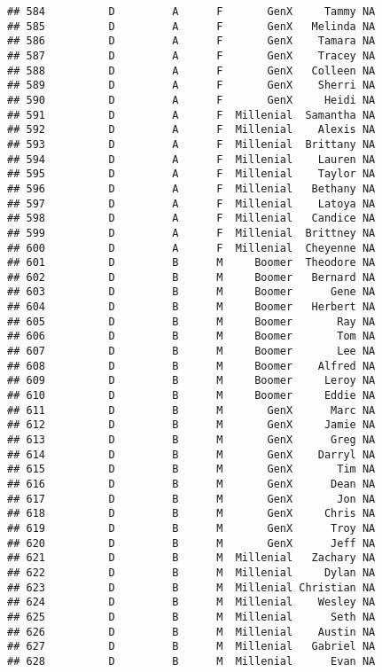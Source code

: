 \documentclass[
]{article}
\begin{document}
\begin{verbatim}
## 584          D         A      F       GenX     Tammy NA
## 585          D         A      F       GenX   Melinda NA
## 586          D         A      F       GenX    Tamara NA
## 587          D         A      F       GenX    Tracey NA
## 588          D         A      F       GenX   Colleen NA
## 589          D         A      F       GenX    Sherri NA
## 590          D         A      F       GenX     Heidi NA
## 591          D         A      F  Millenial  Samantha NA
## 592          D         A      F  Millenial    Alexis NA
## 593          D         A      F  Millenial  Brittany NA
## 594          D         A      F  Millenial    Lauren NA
## 595          D         A      F  Millenial    Taylor NA
## 596          D         A      F  Millenial   Bethany NA
## 597          D         A      F  Millenial    Latoya NA
## 598          D         A      F  Millenial   Candice NA
## 599          D         A      F  Millenial  Brittney NA
## 600          D         A      F  Millenial  Cheyenne NA
## 601          D         B      M     Boomer  Theodore NA
## 602          D         B      M     Boomer   Bernard NA
## 603          D         B      M     Boomer      Gene NA
## 604          D         B      M     Boomer   Herbert NA
## 605          D         B      M     Boomer       Ray NA
## 606          D         B      M     Boomer       Tom NA
## 607          D         B      M     Boomer       Lee NA
## 608          D         B      M     Boomer    Alfred NA
## 609          D         B      M     Boomer     Leroy NA
## 610          D         B      M     Boomer     Eddie NA
## 611          D         B      M       GenX      Marc NA
## 612          D         B      M       GenX     Jamie NA
## 613          D         B      M       GenX      Greg NA
## 614          D         B      M       GenX    Darryl NA
## 615          D         B      M       GenX       Tim NA
## 616          D         B      M       GenX      Dean NA
## 617          D         B      M       GenX       Jon NA
## 618          D         B      M       GenX     Chris NA
## 619          D         B      M       GenX      Troy NA
## 620          D         B      M       GenX      Jeff NA
## 621          D         B      M  Millenial   Zachary NA
## 622          D         B      M  Millenial     Dylan NA
## 623          D         B      M  Millenial Christian NA
## 624          D         B      M  Millenial    Wesley NA
## 625          D         B      M  Millenial      Seth NA
## 626          D         B      M  Millenial    Austin NA
## 627          D         B      M  Millenial   Gabriel NA
## 628          D         B      M  Millenial      Evan NA

\end{verbatim}
\end{document}
